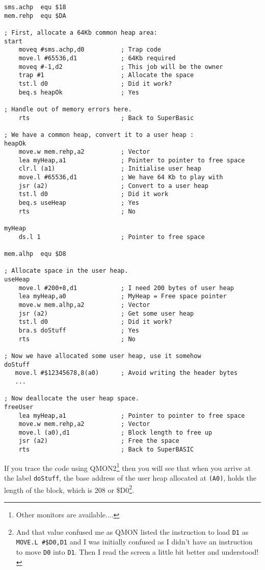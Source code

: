 \begin{lstlisting}[caption={User Heap Vectors Example},label={lis:User-Heap-Vectors-Example}]
sms.achp  equ $18
mem.rehp  equ $DA

; First, allocate a 64Kb common heap area:
start   
    moveq #sms.achp,d0          ; Trap code
    move.l #65536,d1            ; 64Kb required
    moveq #-1,d2                ; This job will be the owner
    trap #1                     ; Allocate the space
    tst.l d0                    ; Did it work?
    beq.s heapOk                ; Yes

; Handle out of memory errors here.
    rts                         ; Back to SuperBasic
        
; We have a common heap, convert it to a user heap :
heapOk
	move.w mem.rehp,a2          ; Vector 
    lea myHeap,a1               ; Pointer to pointer to free space
    clr.l (a1)                  ; Initialise user heap
    move.l #65536,d1            ; We have 64 Kb to play with
    jsr (a2)                    ; Convert to a user heap
    tst.l d0                    ; Did it work
    beq.s useHeap               ; Yes
    rts                         ; No

myHeap
	ds.l 1                      ; Pointer to free space

mem.alhp  equ $D8

; Allocate space in the user heap.
useHeap
    move.l #200+8,d1            ; I need 200 bytes of user heap
    lea myHeap,a0               ; MyHeap = Free space pointer
    move.w mem.alhp,a2          ; Vector
    jsr (a2)                    ; Get some user heap
    tst.l d0                    ; Did it work?
    bra.s doStuff               ; Yes
    rts                         ; No
        
; Now we have allocated some user heap, use it somehow
doStuff 
   move.l #$12345678,8(a0)      ; Avoid writing the header bytes
   ...

; Now deallocate the user heap space.
freeUser  
    lea myHeap,a1               ; Pointer to pointer to free space
	move.w mem.rehp,a2          ; Vector 
    move.l (a0),d1              ; Block length to free up
    jsr (a2)                    ; Free the space
    rts                         ; Back to SuperBASIC

\end{lstlisting}

If you trace the code using QMON2\footnote{Other monitors are available....}
then you will see that when you arrive at the label \texttt{doStuff},
the base address of the user heap allocated at \texttt{(A0)}, holds
the length of the block, which is 208 or \$D0\footnote{And that value confused me as QMON listed the instruction to load
\texttt{D1} as \texttt{MOVE.L \#\$D0,D1} and I was initially confused
as I didn't have an instruction to move \texttt{D0} into \texttt{D1}.
Then I read the screen a little bit better and understood!}.

